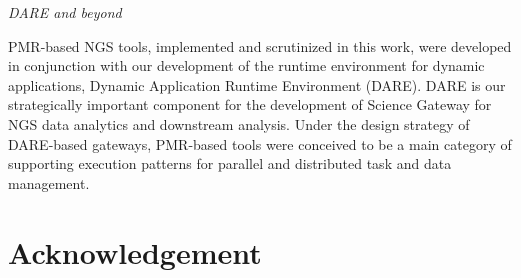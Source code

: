 \documentclass{acm_proc_article-sp}
\begin{document}
%


\textit{DARE and beyond}

PMR-based NGS tools, implemented and scrutinized in this work, were developed in conjunction with our development of the runtime environment for dynamic applications, Dynamic Application Runtime Environment (DARE)\cite{dare-tg11,dare-ecmls11}.  DARE is our strategically important component for the development of Science Gateway for NGS data analytics and downstream analysis.  Under the design strategy of DARE-based gateways, PMR-based tools were conceived to be a main category of supporting execution patterns for parallel and distributed task and data management.  




\section*{Acknowledgement}
\end{document}
